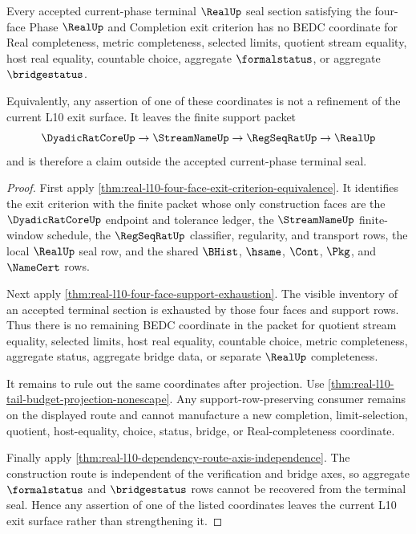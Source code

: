 \begin{theorem}\label{thm:real-l10-completeness-coordinate-refusal}
Every accepted current-phase terminal $\RealUp$ seal section satisfying the four-face Phase $\RealUp$ and Completion exit criterion has no BEDC coordinate for Real completeness, metric completeness, selected limits, quotient stream equality, host real equality, countable choice, aggregate $\formalstatus$, or aggregate $\bridgestatus$.

Equivalently, any assertion of one of these coordinates is not a refinement of the current L10 exit surface. It leaves the finite support packet
$$
\DyadicRatCoreUp \to \StreamNameUp \to \RegSeqRatUp \to \RealUp
$$
and is therefore a claim outside the accepted current-phase terminal seal.
\end{theorem}
\begin{proof}
First apply \autoref{thm:real-l10-four-face-exit-criterion-equivalence}. It identifies the exit criterion with the finite packet whose only construction faces are the $\DyadicRatCoreUp$ endpoint and tolerance ledger, the $\StreamNameUp$ finite-window schedule, the $\RegSeqRatUp$ classifier, regularity, and transport rows, the local $\RealUp$ seal row, and the shared $\BHist$, $\hsame$, $\Cont$, $\Pkg$, and $\NameCert$ rows.

Next apply \autoref{thm:real-l10-four-face-support-exhaustion}. The visible inventory of an accepted terminal section is exhausted by those four faces and support rows. Thus there is no remaining BEDC coordinate in the packet for quotient stream equality, selected limits, host real equality, countable choice, metric completeness, aggregate status, aggregate bridge data, or separate $\RealUp$ completeness.

It remains to rule out the same coordinates after projection. Use \autoref{thm:real-l10-tail-budget-projection-nonescape}. Any support-row-preserving consumer remains on the displayed route and cannot manufacture a new completion, limit-selection, quotient, host-equality, choice, status, bridge, or Real-completeness coordinate.

Finally apply \autoref{thm:real-l10-dependency-route-axis-independence}. The construction route is independent of the verification and bridge axes, so aggregate $\formalstatus$ and $\bridgestatus$ rows cannot be recovered from the terminal seal. Hence any assertion of one of the listed coordinates leaves the current L10 exit surface rather than strengthening it.
\end{proof}

